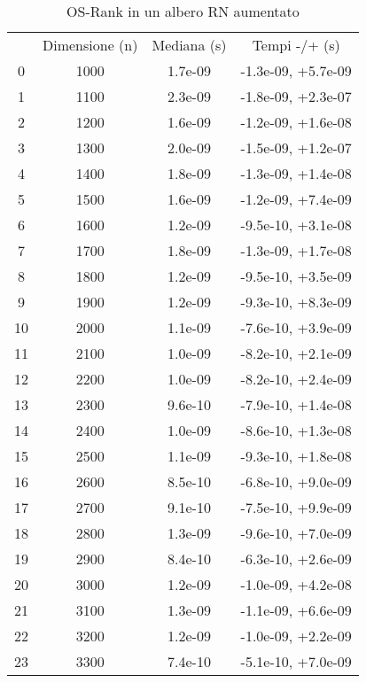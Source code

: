\begin{table}
\centering
\caption{OS-Rank in un albero RN aumentato}
\label{OS-Rank in un albero RN aumentato}
\begin{adjustbox}{width=1\textwidth/2}
\begin{tabular}{|c|c|c|c|}
\hline
 & Dimensione (n) & Mediana (s) & Tempi -/+ (s) \\
0 & 1000 & 1.7e-09 & -1.3e-09, +5.7e-09 \\
\cline{1-4}
1 & 1100 & 2.3e-09 & -1.8e-09, +2.3e-07 \\
\cline{1-4}
2 & 1200 & 1.6e-09 & -1.2e-09, +1.6e-08 \\
\cline{1-4}
3 & 1300 & 2.0e-09 & -1.5e-09, +1.2e-07 \\
\cline{1-4}
4 & 1400 & 1.8e-09 & -1.3e-09, +1.4e-08 \\
\cline{1-4}
5 & 1500 & 1.6e-09 & -1.2e-09, +7.4e-09 \\
\cline{1-4}
6 & 1600 & 1.2e-09 & -9.5e-10, +3.1e-08 \\
\cline{1-4}
7 & 1700 & 1.8e-09 & -1.3e-09, +1.7e-08 \\
\cline{1-4}
8 & 1800 & 1.2e-09 & -9.5e-10, +3.5e-09 \\
\cline{1-4}
9 & 1900 & 1.2e-09 & -9.3e-10, +8.3e-09 \\
\cline{1-4}
10 & 2000 & 1.1e-09 & -7.6e-10, +3.9e-09 \\
\cline{1-4}
11 & 2100 & 1.0e-09 & -8.2e-10, +2.1e-09 \\
\cline{1-4}
12 & 2200 & 1.0e-09 & -8.2e-10, +2.4e-09 \\
\cline{1-4}
13 & 2300 & 9.6e-10 & -7.9e-10, +1.4e-08 \\
\cline{1-4}
14 & 2400 & 1.0e-09 & -8.6e-10, +1.3e-08 \\
\cline{1-4}
15 & 2500 & 1.1e-09 & -9.3e-10, +1.8e-08 \\
\cline{1-4}
16 & 2600 & 8.5e-10 & -6.8e-10, +9.0e-09 \\
\cline{1-4}
17 & 2700 & 9.1e-10 & -7.5e-10, +9.9e-09 \\
\cline{1-4}
18 & 2800 & 1.3e-09 & -9.6e-10, +7.0e-09 \\
\cline{1-4}
19 & 2900 & 8.4e-10 & -6.3e-10, +2.6e-09 \\
\cline{1-4}
20 & 3000 & 1.2e-09 & -1.0e-09, +4.2e-08 \\
\cline{1-4}
21 & 3100 & 1.3e-09 & -1.1e-09, +6.6e-09 \\
\cline{1-4}
22 & 3200 & 1.2e-09 & -1.0e-09, +2.2e-09 \\
\cline{1-4}
23 & 3300 & 7.4e-10 & -5.1e-10, +7.0e-09 \\

\end{tabular}
\end{adjustbox}
\end{table}
